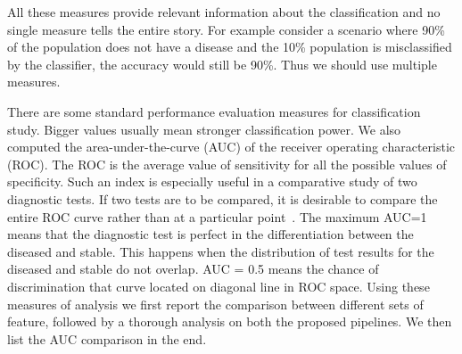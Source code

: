 All these measures provide relevant information about the classification and no single measure tells the entire story. For example consider a scenario where 90\% of the population does not have a disease and the 10\% population is misclassified by the classifier, the accuracy would still be 90\%. Thus we should use multiple measures.   

There are some standard performance evaluation measures for classification study. Bigger values usually mean stronger classification power. We also computed the area-under-the-curve (AUC) of the receiver operating characteristic (ROC). The ROC is the average value of sensitivity for all the possible values of specificity. Such an index is especially useful in a comparative study of two diagnostic tests. If two tests are to be compared, it is desirable to compare the entire ROC curve rather than at a particular point~\citep{swets1979roc}. The maximum AUC=1 means that the diagnostic test is perfect in the differentiation between the diseased and stable. This happens when the distribution of test results for the diseased and stable do not overlap. AUC = 0.5 means the chance of discrimination that curve located on diagonal line in ROC space. Using these measures of analysis we first report the comparison between different sets of feature, followed by a thorough analysis on both the proposed pipelines. We then list the AUC comparison in the end.

